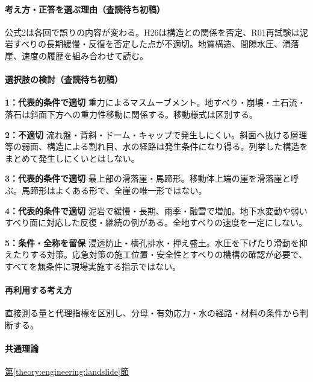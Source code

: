 \paragraph{考え方・正答を選ぶ理由（査読待ち初稿）} 公式2は各回で誤りの内容が変わる。H26は構造との関係を否定、R01再試験は泥岩すべりの長期緩慢・反復を否定した点が不適切。地質構造、間隙水圧、滑落崖、速度の履歴を組み合わせて読む。

\paragraph{選択肢の検討（査読待ち初稿）}\mbox{}\par

\noindent\textbf{1：代表的条件で適切} 重力によるマスムーブメント。地すべり・崩壊・土石流・落石は斜面下方への重力性移動に関係する。移動様式は区別する。\par

\noindent\textbf{2：不適切} 流れ盤・背斜・ドーム・キャップで発生しにくい。斜面へ抜ける層理等の弱面、構造による割れ目、水の経路は発生条件になり得る。列挙した構造をまとめて発生しにくいとはしない。\par

\noindent\textbf{3：代表的条件で適切} 最上部の滑落崖・馬蹄形。移動体上端の崖を滑落崖と呼ぶ。馬蹄形はよくある形で、全崖の唯一形ではない。\par

\noindent\textbf{4：代表的条件で適切} 泥岩で緩慢・長期、雨季・融雪で増加。地下水変動や弱いすべり面に対応した反復・継続の例がある。全地すべりの速度を一定にしない。\par

\noindent\textbf{5：条件・全称を留保} 浸透防止・横孔排水・押え盛土。水圧を下げたり滑動を抑えたりする対策。応急対策の施工位置・安全性とすべりの機構の確認が必要で、すべてを無条件に現場実施する指示ではない。\par

\paragraph{再利用する考え方} 直接測る量と代理指標を区別し、分母・有効応力・水の経路・材料の条件から判断する。

\paragraph{共通理論} \hyperref[theory:engineering:landslide]{第\ref*{theory:engineering:landslide}節}

